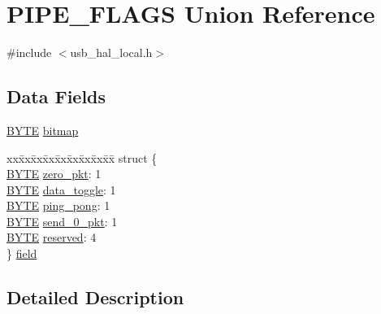 \hypertarget{union_p_i_p_e___f_l_a_g_s}{}\section{P\+I\+P\+E\+\_\+\+F\+L\+A\+G\+S Union Reference}
\label{union_p_i_p_e___f_l_a_g_s}


{\ttfamily \#include $<$usb\+\_\+hal\+\_\+local.\+h$>$}

\subsection*{Data Fields}
\begin{DoxyCompactItemize}
\item 
\hyperlink{_generic_type_defs_8h_a4ae1dab0fb4b072a66584546209e7d58}{B\+Y\+T\+E} \hyperlink{union_p_i_p_e___f_l_a_g_s_aeaf0bd08f496808a64c5beb062fb535e}{bitmap}
\item 
\begin{tabbing}
xx\=xx\=xx\=xx\=xx\=xx\=xx\=xx\=xx\=\kill
struct \{\\
\>\hyperlink{_generic_type_defs_8h_a4ae1dab0fb4b072a66584546209e7d58}{BYTE} \hyperlink{union_p_i_p_e___f_l_a_g_s_a9e4e83aa407fb630212de02d83d6057c}{zero\_pkt}: 1\\
\>\hyperlink{_generic_type_defs_8h_a4ae1dab0fb4b072a66584546209e7d58}{BYTE} \hyperlink{union_p_i_p_e___f_l_a_g_s_a7afb68620627fc9e2c68713ce4676a87}{data\_toggle}: 1\\
\>\hyperlink{_generic_type_defs_8h_a4ae1dab0fb4b072a66584546209e7d58}{BYTE} \hyperlink{union_p_i_p_e___f_l_a_g_s_a90625cae626baec3b0e8256b52dcc254}{ping\_pong}: 1\\
\>\hyperlink{_generic_type_defs_8h_a4ae1dab0fb4b072a66584546209e7d58}{BYTE} \hyperlink{union_p_i_p_e___f_l_a_g_s_a37adb8ddf2e6e38a0793f81ec8c1c1ed}{send\_0\_pkt}: 1\\
\>\hyperlink{_generic_type_defs_8h_a4ae1dab0fb4b072a66584546209e7d58}{BYTE} \hyperlink{union_p_i_p_e___f_l_a_g_s_a32acc012851fc2bad318c8a2e590bc75}{reserved}: 4\\
\} \hyperlink{union_p_i_p_e___f_l_a_g_s_afbefd008fb88e2e988d0d741ecf947b4}{field}\\

\end{tabbing}\end{DoxyCompactItemize}


\subsection{Detailed Description}


